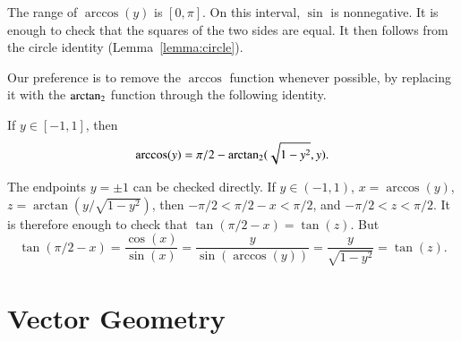 \begin{proved}
    The range of $\arccos(y)$ is $[0,\pi]$.  On this interval, $\sin$
    is nonnegative.  It is enough to check that the squares of the two sides are equal.  It then follows from the circle identity
    (Lemma~\ref{lemma:circle}).
\swallowed\end{proved}


Our preference is to remove the $\arccos$ function whenever
possible, by replacing it with the ${\operatorname{arctan_2}}$ function through the
following identity.  


\begin{lemma}\label{lemma:arccos-arctan}  
If $y\in [-1,1]$, then
    $$\arccos(y) = \pi/2 - {\operatorname{arctan_2}}({ \sqrt{1-y^2}},{y}).$$
\end{lemma}
%
%
%
%

\begin{proved}
The endpoints $y=\pm1$ can be checked directly.
If $y\in (-1,1)$,  $x = \arccos(y)$, 
$z = \arctan(y/\sqrt{1-y^2})$, then
    $-\pi/2 < \pi/2 - x < \pi/2$, and $-\pi/2 < z < \pi/2$.  It is
    therefore enough to check that
        $\tan(\pi/2 - x) = \tan(z)$.
    But
        $$\tan(\pi/2-x) = \frac{\cos(x)}{\sin(x)} = \frac{y}{
        \sin(\arccos(y))} = \frac{y}{ \sqrt{1-y^2}} = \tan(z).$$
\swallowed\end{proved}

%





\section{Vector Geometry}


